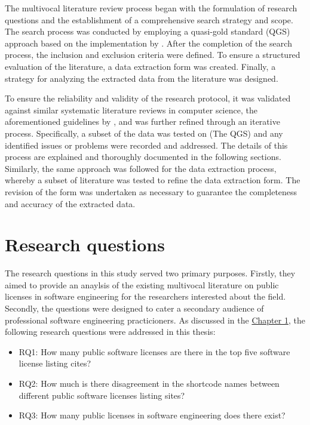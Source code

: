 The multivocal literature review process began with the formulation of research questions and the establishment of a comprehensive search strategy and scope. The search process was conducted by employing a quasi-gold standard (QGS) approach based on the implementation by \cite{qgs}. After the completion of the search process, the inclusion and exclusion criteria were defined. To ensure a structured evaluation of the literature, a data extraction form was created. Finally, a strategy for analyzing the extracted data from the literature was designed.

 To ensure the reliability and validity of the research protocol, it was validated against similar systematic literature reviews in computer science, the aforementioned guidelines by \cite{kitchenham2007}, and was further refined through an iterative process. Specifically, a subset of the data was tested on (The QGS) and any identified issues or problems were recorded and addressed. The details of this process are explained and thoroughly documented in the following sections. Similarly, the same approach was followed for the data extraction process, whereby a subset of literature was tested to refine the data extraction form. The revision of the form was undertaken as necessary to guarantee the completeness and accuracy of the extracted data.

\section{Research questions}
The research questions in this study served two primary purposes. Firstly, they aimed to provide an anaylsis of the existing multivocal literature on public licenses in software engineering for the researchers interested about the field. Secondly, the questions were designed to cater a secondary audience of professional software engineering practicioners. As discussed in the \hyperref[intro]{Chapter 1}, the following research questions were addressed in this thesis:

\begin{itemize}
	\item RQ1: How many public software licenses are there in the top five software license listing cites?
	\item RQ2: How much is there disagreement in the shortcode names between different public software licenses listing sites?
	\item RQ3: How many public licenses in software engineering does there exist?
\end{itemize}

